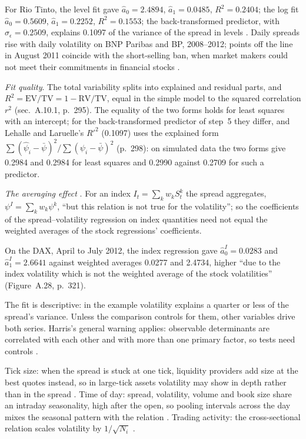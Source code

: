 \begin{qfmethod}
 For Rio Tinto, the level fit gave $\hat a_0=2.4894$, $\hat a_1=0.0485$, $R^2=0.2404$; the log fit $\hat a_0=0.5609$, $\hat a_1=0.2252$, $R^2=0.1553$; the back-transformed predictor, with $\hat\sigma_\epsilon=0.2509$, explains 0.1097 of the variance of the spread in levels \citep[app.~A, Figures~A.14, A.17 and~A.18, pp.~296--298]{alpha-laruelle}. Daily spreads rise with daily volatility on BNP Paribas and BP, 2008--2012; points off the line in August 2011 coincide with the short-selling ban, when market makers could not meet their commitments in financial stocks \citep[chap.~2, sec.~2.3.1, Figure~2.13, pp.~150--151]{alpha-laruelle}.

\emph{Fit quality}. The total variability splits into explained and residual parts, and $R^2=\mathrm{EV}/\mathrm{TV}=1-\mathrm{RV}/\mathrm{TV}$, equal in the simple model to the squared correlation $r^2$ (sec.~A.10.1, p.~295). The equality of the two forms holds for least squares with an intercept; for the back-transformed predictor of step~5 they differ, and Lehalle and Laruelle's $R'^2$ (0.1097) uses the explained form $\sum(\hat\psi_i-\bar\psi)^2/\sum(\psi_i-\bar\psi)^2$ (p.~298): on simulated data the two forms give 0.2984 and 0.2984 for least squares and 0.2990 against 0.2709 for such a predictor.

\emph{The averaging effect} \citep[app.~A, sec.~A.14.2, pp.~319--321]{alpha-laruelle}. For an index $I_t=\sum_kw_kS^k_t$ the spread aggregates, $\psi^I=\sum_kw_k\psi^k$, ``but this relation is not true for the volatility''; so the coefficients of the spread--volatility regression on index quantities need not equal the weighted averages of the stock regressions' coefficients.

On the DAX, April to July 2012, the index regression gave $\hat a^I_0=0.0283$ and $\hat a^I_1=2.6641$ against weighted averages 0.0277 and 2.4734, higher ``due to the index volatility which is not the weighted average of the stock volatilities'' (Figure~A.28, p.~321).

 The fit is descriptive: in the example volatility explains a quarter or less of the spread's variance. Unless the comparison controls for them, other variables drive both series. Harris's general warning applies: observable determinants are correlated with each other and with more than one primary factor, so tests need controls \citep[chap.~``Bid/Ask Spreads'', p.~314]{alpha-harris}.

Tick size: when the spread is stuck at one tick, liquidity providers add size at the best quotes instead, so in large-tick assets volatility may show in depth rather than in the spread \citep[chap.~2, sec.~2.2, p.~148]{alpha-laruelle}. Time of day: spread, volatility, volume and book size share an intraday seasonality, high after the open, so pooling intervals across the day mixes the seasonal pattern with the relation \citep[same sec., pp.~145--148]{alpha-laruelle}. Trading activity: the cross-sectional relation scales volatility by $1/\sqrt{N_i}$ \citep[same sec., pp.~144--145]{alpha-laruelle}.


\end{qfmethod}

